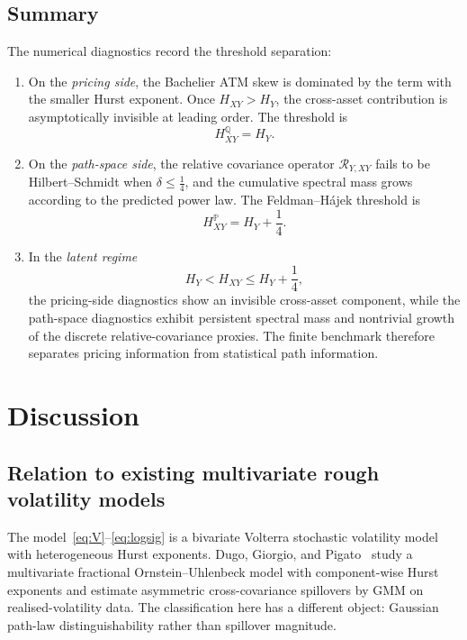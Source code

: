 \documentclass[11pt,a4paper]{amsart}
\theoremstyle{plain}
\theoremstyle{definition}
\theoremstyle{remark}
\newcommand{\Q}{\mathbb{Q}}
\newcommand{\PP}{\mathbb{P}}
\begin{document}
\subsection{Summary}

The numerical diagnostics record the threshold separation:
\begin{enumerate}
\item On the \emph{pricing side}, the Bachelier ATM skew is dominated by the term with the smaller
Hurst exponent.  Once $H_{XY}>H_Y$, the cross-asset contribution is asymptotically invisible at
leading order.  The threshold is
\[
H_{XY}^{\Q}=H_Y.
\]

\item On the \emph{path-space side}, the relative covariance operator \(\mathcal R_{Y,XY}\) fails
to be Hilbert--Schmidt when \(\delta\le\frac14\), and the cumulative spectral mass grows according
to the predicted power law. The Feldman--H\'ajek threshold is
\[
H_{XY}^{\PP}=H_Y+\frac14.
\]

\item In the \emph{latent regime}
\[
H_Y < H_{XY} \le H_Y+\frac14,
\]
the pricing-side diagnostics show an invisible cross-asset component, while the path-space
diagnostics exhibit persistent spectral mass and nontrivial growth of the discrete
relative-covariance proxies.  The finite benchmark therefore separates pricing information from
statistical path information.
\end{enumerate}

\section{Discussion}\label{sec:discussion}

\subsection{Relation to existing multivariate rough volatility models}

The model~\eqref{eq:V}--\eqref{eq:logsig} is a bivariate Volterra stochastic volatility model
with heterogeneous Hurst exponents.  Dugo, Giorgio, and Pigato~\cite{DGP24} study a multivariate
fractional Ornstein--Uhlenbeck model with component-wise Hurst exponents and estimate asymmetric
cross-covariance spillovers by GMM on realised-volatility data.  The classification here has a
different object: Gaussian path-law distinguishability rather than spillover magnitude.
\end{document}
